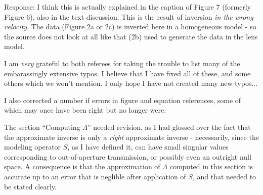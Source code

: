 \documentclass[12pt]{article}
\begin{document}
Response: I think this is actually explained in the caption of Figure 7 (formerly Figure 6), also in the text discussion. This is the result of inversion {\em in the wrong velocity}. The data (Figure 2a or 2c) is inverted here in a homogeneous model - so the source does not look at all like that (2b) used to generate the data in the lens model.


I am {\em very} grateful to both referees for taking the trouble to list many of the embarassingly extensive typos. I believe that I have fixed all of these, and some others which we won't mention. I only hope I have not created many new typos...

I also corrected a number if errors in figure and equation references, some of which may once have been right but no longer were.

The section ``Computing $\Lambda$'' needed revision, as I had glossed over the fact that the approximate inverse is only a {\em right} approximate inverse - necessarily, since the modeling operator $S$, as I have defined it, can have small singular values corresponding to out-of-aperture transmission, or possibly even an outright null space. A consequence is that the approximation of $\Lambda$ computed in this section is accurate up to an error that is neglible after application of $S$, and that needed to be stated clearly. 
\end{document}
